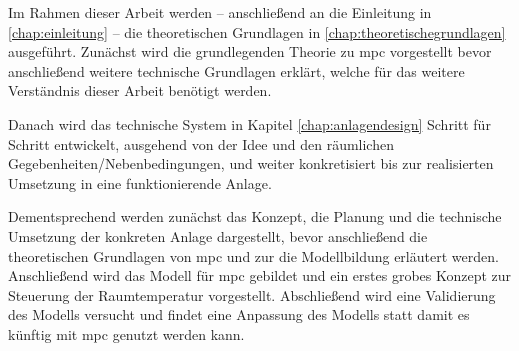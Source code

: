 Im Rahmen dieser Arbeit werden -- anschließend an die Einleitung in \ref{chap:einleitung} -- die theoretischen Grundlagen in \ref{chap:theoretischegrundlagen} ausgeführt. Zunächst wird die grundlegenden Theorie zu \acrlong{mpc} vorgestellt bevor anschließend weitere technische Grundlagen erklärt, welche für das weitere Verständnis dieser Arbeit benötigt werden. 

Danach wird das technische System in Kapitel \ref{chap:anlagendesign} Schritt für Schritt entwickelt, ausgehend von der Idee und den räumlichen Gegebenheiten/Nebenbedingungen, und weiter konkretisiert bis zur realisierten Umsetzung in eine funktionierende Anlage.



Dementsprechend werden zunächst das Konzept, die Planung und die technische Umsetzung der konkreten Anlage dargestellt, bevor anschließend die theoretischen Grundlagen von \acrlong{mpc} und zur die Modellbildung erläutert werden. Anschließend wird das Modell für \acrlong{mpc} gebildet und ein erstes grobes Konzept zur Steuerung der Raumtemperatur vorgestellt. Abschließend wird eine Validierung des Modells versucht und findet eine Anpassung des Modells statt damit es künftig mit \acrlong{mpc} genutzt werden kann.